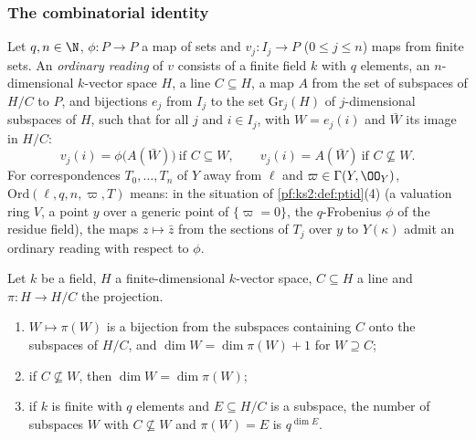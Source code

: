 \subsubsection{The combinatorial identity}

\begin{definition}\label{pf:ks2:def:ordread}
Let $q,n\in\N$, $\phi\colon P\to P$ a map of sets and $v_j\colon I_j\to P$ ($0\le j\le n$) maps from
finite sets. An \emph{ordinary reading} of $v$
consists of a finite field $k$ with $q$ elements, an $n$-dimensional $k$-vector space $H$, a line
$C\subseteq H$, a map $A$ from the set of subspaces of $H/C$ to $P$, and bijections $e_j$ from
$I_j$ to the set $\mathrm{Gr}_j(H)$ of $j$-dimensional subspaces of $H$, such that for all $j$ and
$i\in I_j$, with $W=e_j(i)$ and $\bar W$ its image in $H/C$:
\[
 v_j(i)=\phi\bigl(A(\bar W)\bigr)\ \text{if } C\subseteq W,\qquad v_j(i)=A(\bar W)\ \text{if }
 C\not\subseteq W.
\]
For correspondences $T_0,\dots,T_n$ of $Y$ away from $\ell$ and $\varpi\in\Gamma(Y,\OO_Y)$,
$\mathrm{Ord}(\ell,q,n,\varpi,T)$ means:
in the situation of \cref{pf:ks2:def:ptid}(4) (a valuation ring $V$, a point $y$ over a generic point
of $\{\varpi=0\}$, the $q$-Frobenius $\phi$ of the residue field), the maps $z\mapsto\bar z$ from the
sections of $T_j$ over $y$ to $Y(\kappa)$ admit an ordinary reading with respect to $\phi$.
\end{definition}

\begin{lemma}\label{pf:ks2:countin}
Let $k$ be a field, $H$ a finite-dimensional $k$-vector space, $C\subseteq H$ a line and
$\pi\colon H\to H/C$ the projection.
\begin{enumerate}
\item $W\mapsto\pi(W)$ is a bijection from the subspaces containing $C$ onto the subspaces of $H/C$,
  and $\dim W=\dim\pi(W)+1$ for $W\supseteq C$;
\item if $C\not\subseteq W$, then $\dim W=\dim\pi(W)$;
\item if $k$ is finite with $q$ elements and $E\subseteq H/C$ is a subspace, the number of subspaces
  $W$ with $C\not\subseteq W$ and $\pi(W)=E$ is $q^{\dim E}$.
\end{enumerate}
\end{lemma}

